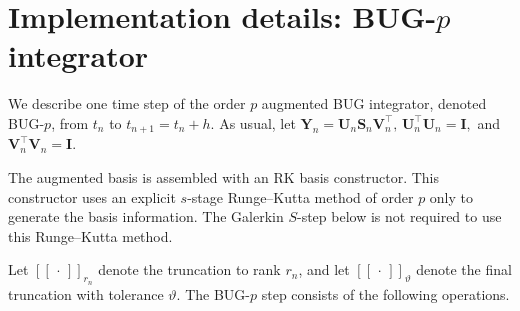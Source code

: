 \documentclass[preprint,runningheads]{svjour3}
\newcommand\bfI{{\mathbf I}}
\newcommand\bfS{{\mathbf S}}
\newcommand\bfU{{\mathbf U}}
\newcommand\bfV{{\mathbf V}}
\newcommand\bfY{{\mathbf Y}}
\begin{document}
\section{Implementation details: BUG-$p$ integrator}
\label{sec:impl_bugp}

We describe one time step of the order $p$ augmented BUG integrator, denoted
BUG-$p$, from $t_n$ to $t_{n+1}=t_n+h$. As usual, let
$
    \bfY_n=\bfU_n\bfS_n\bfV_n^\top,\,
$$
    \bfU_n^\top\bfU_n=\bfI,
$  and  $
    \bfV_n^\top\bfV_n=\bfI .
$

The augmented basis is assembled with an RK basis constructor. This constructor
uses an explicit $s$-stage Runge--Kutta method of order $p$ only to generate the
basis information. The Galerkin $S$-step below is not required to use this
Runge--Kutta method.

Let $[\![\,\cdot\,]\!]_{r_n}$ denote the truncation to rank $r_n$, and let
$[\![\,\cdot\,]\!]_{\vartheta}$ denote the final truncation with tolerance
$\vartheta$.
The BUG-$p$ step consists of the following operations.
\end{document}
